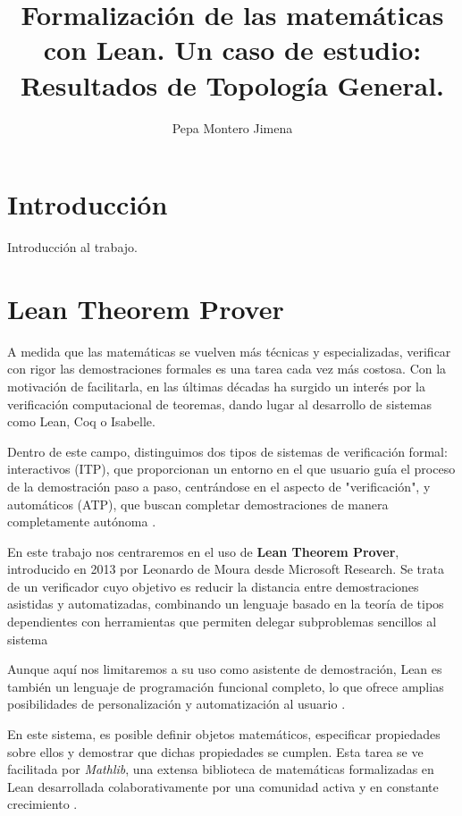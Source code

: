 \documentclass{article}
\title{Formalización de las matemáticas con Lean. Un caso de estudio: Resultados de Topología General.}
\author{Pepa Montero Jimena}
\date{}
\begin{document}
\maketitle
\tableofcontents


\section{Introducción}

Introducción al trabajo.





\newpage

\section{Lean Theorem Prover}

A medida que las matemáticas se vuelven más técnicas y especializadas, verificar con rigor las demostraciones formales es una tarea cada vez más costosa. Con la motivación de facilitarla, en las últimas décadas ha surgido un interés por la verificación computacional de teoremas, dando lugar al desarrollo de sistemas como Lean, Coq o Isabelle.

Dentro de este campo, distinguimos dos tipos de sistemas de verificación formal: interactivos (ITP), que proporcionan un entorno en el que usuario guía el proceso de la demostración paso a paso, centrándose en el aspecto de "verificación", y automáticos (ATP), que buscan completar demostraciones de manera completamente autónoma \cite[Sección~1]{avigad2024theorem}.

En este trabajo nos centraremos en el uso de \textbf{Lean Theorem Prover}, introducido en 2013 por Leonardo de Moura desde Microsoft Research. Se trata de un verificador cuyo objetivo es reducir la distancia entre demostraciones asistidas y automatizadas, combinando un lenguaje basado en la teoría de tipos dependientes con herramientas que permiten delegar subproblemas sencillos al sistema

Aunque aquí nos limitaremos a su uso como asistente de demostración, Lean es también un lenguaje de programación funcional completo, lo que ofrece amplias posibilidades de personalización y automatización al usuario \cite[Sección~1]{avigad2024theorem}.

En este sistema, es posible definir objetos matemáticos, especificar propiedades sobre ellos y demostrar que dichas propiedades se cumplen. Esta tarea se ve facilitada por \textit{Mathlib}, una extensa biblioteca de matemáticas formalizadas en Lean desarrollada colaborativamente por una comunidad activa y en constante crecimiento \cite{mathlib}.
\end{document}
